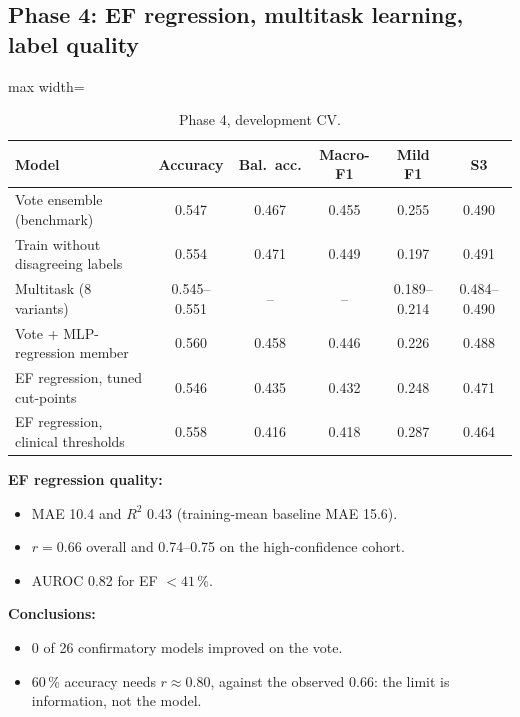 \subsection{Phase 4: EF regression, multitask learning, label quality}
\begin{table}[H]\centering\small
\caption{Phase 4, development CV.}\label{tab:p4}
\begin{adjustbox}{max width=\linewidth}
\begin{tabular}{lccccc}\toprule
Model & Accuracy & Bal.\ acc. & Macro-F1 & Mild F1 & S3 \\\midrule
Vote ensemble (benchmark) & 0.547 & 0.467 & 0.455 & 0.255 & 0.490 \\
Train without disagreeing labels & 0.554 & 0.471 & 0.449 & 0.197 & 0.491 \\
Multitask (8 variants) & 0.545--0.551 & -- & -- & 0.189--0.214 & 0.484--0.490 \\
Vote + MLP-regression member & 0.560 & 0.458 & 0.446 & 0.226 & 0.488 \\
EF regression, tuned cut-points & 0.546 & 0.435 & 0.432 & 0.248 & 0.471 \\
EF regression, clinical thresholds & 0.558 & 0.416 & 0.418 & 0.287 & 0.464 \\\bottomrule
\end{tabular}
\end{adjustbox}
\end{table}
\textbf{EF regression quality:}
\begin{itemize}
  \item MAE 10.4 and $R^2$ 0.43 (training-mean baseline MAE 15.6).
  \item $r=0.66$ overall and 0.74--0.75 on the high-confidence cohort.
  \item AUROC 0.82 for EF $<41$\,\%.
\end{itemize}
\textbf{Conclusions:}
\begin{itemize}
  \item 0 of 26 confirmatory models improved on the vote.
  \item 60\,\% accuracy needs $r\approx0.80$, against the observed 0.66: the limit is information, not the model.
\end{itemize}

